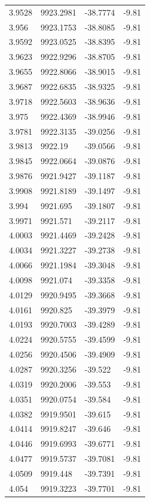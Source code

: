 \begin{table}[H]
\begin{tabular}{llll}
3.9528 & 9923.2981 & -38.7774 & -9.81 \\
3.956 & 9923.1753 & -38.8085 & -9.81 \\
3.9592 & 9923.0525 & -38.8395 & -9.81 \\
3.9623 & 9922.9296 & -38.8705 & -9.81 \\
3.9655 & 9922.8066 & -38.9015 & -9.81 \\
3.9687 & 9922.6835 & -38.9325 & -9.81 \\
3.9718 & 9922.5603 & -38.9636 & -9.81 \\
3.975 & 9922.4369 & -38.9946 & -9.81 \\
3.9781 & 9922.3135 & -39.0256 & -9.81 \\
3.9813 & 9922.19 & -39.0566 & -9.81 \\
3.9845 & 9922.0664 & -39.0876 & -9.81 \\
3.9876 & 9921.9427 & -39.1187 & -9.81 \\
3.9908 & 9921.8189 & -39.1497 & -9.81 \\
3.994 & 9921.695 & -39.1807 & -9.81 \\
3.9971 & 9921.571 & -39.2117 & -9.81 \\
4.0003 & 9921.4469 & -39.2428 & -9.81 \\
4.0034 & 9921.3227 & -39.2738 & -9.81 \\
4.0066 & 9921.1984 & -39.3048 & -9.81 \\
4.0098 & 9921.074 & -39.3358 & -9.81 \\
4.0129 & 9920.9495 & -39.3668 & -9.81 \\
4.0161 & 9920.825 & -39.3979 & -9.81 \\
4.0193 & 9920.7003 & -39.4289 & -9.81 \\
4.0224 & 9920.5755 & -39.4599 & -9.81 \\
4.0256 & 9920.4506 & -39.4909 & -9.81 \\
4.0287 & 9920.3256 & -39.522 & -9.81 \\
4.0319 & 9920.2006 & -39.553 & -9.81 \\
4.0351 & 9920.0754 & -39.584 & -9.81 \\
4.0382 & 9919.9501 & -39.615 & -9.81 \\
4.0414 & 9919.8247 & -39.646 & -9.81 \\
4.0446 & 9919.6993 & -39.6771 & -9.81 \\
4.0477 & 9919.5737 & -39.7081 & -9.81 \\
4.0509 & 9919.448 & -39.7391 & -9.81 \\
4.054 & 9919.3223 & -39.7701 & -9.81 \\

\end{tabular}
\end{table}
